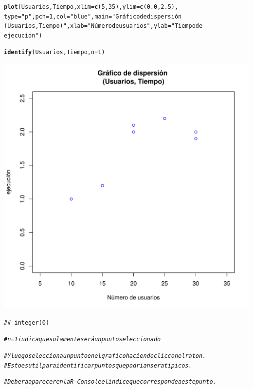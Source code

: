 \documentclass[12pt,letterpaper]{article}\usepackage[]{graphicx}\usepackage[]{color}
\makeatletter
\def\maxwidth{ %
  \ifdim\Gin@nat@width>\linewidth
    \linewidth
  \else
    \Gin@nat@width
  \fi
}
\newcommand{\hlnum}[1]{\textcolor[rgb]{0.686,0.059,0.569}{#1}}%
\newcommand{\hlstr}[1]{\textcolor[rgb]{0.192,0.494,0.8}{#1}}%
\newcommand{\hlcom}[1]{\textcolor[rgb]{0.678,0.584,0.686}{\textit{#1}}}%
\newcommand{\hlstd}[1]{\textcolor[rgb]{0.345,0.345,0.345}{#1}}%
\newcommand{\hlkwc}[1]{\textcolor[rgb]{0.333,0.667,0.333}{#1}}%
\newcommand{\hlkwd}[1]{\textcolor[rgb]{0.737,0.353,0.396}{\textbf{#1}}}%
\newenvironment{kframe}{%
 \def\at@end@of@kframe{}%
 \ifinner\ifhmode%
  \def\at@end@of@kframe{\end{minipage}}%
  \begin{minipage}{\columnwidth}%
 \fi\fi%
 \def\FrameCommand##1{\hskip\@totalleftmargin \hskip-\fboxsep
 \colorbox{shadecolor}{##1}\hskip-\fboxsep
     \hskip-\linewidth \hskip-\@totalleftmargin \hskip\columnwidth}%
 \MakeFramed {\advance\hsize-\width
   \@totalleftmargin\z@ \linewidth\hsize
   \@setminipage}}%
 {\par\unskip\endMakeFramed%
 \at@end@of@kframe}
\newenvironment{knitrout}{}{} %
\makeatother
\begin{document}
\begin{enumerate}
\begin{knitrout}
\begin{kframe}
\begin{alltt}
\hlkwd{plot}\hlstd{(Usuarios, Tiempo,} \hlkwc{xlim}\hlstd{=} \hlkwd{c}\hlstd{(}\hlnum{5}\hlstd{,} \hlnum{35}\hlstd{),} \hlkwc{ylim}\hlstd{=} \hlkwd{c}\hlstd{(}\hlnum{0.0}\hlstd{,} \hlnum{2.5}\hlstd{),}
\hlkwc{type} \hlstd{=} \hlstr{"p"}\hlstd{,} \hlkwc{pch}\hlstd{=}\hlnum{1}\hlstd{,} \hlkwc{col} \hlstd{=} \hlstr{"blue"}\hlstd{,} \hlkwc{main} \hlstd{=} \hlstr{"Gráfico de dispersión 
(Usuarios, Tiempo)"}\hlstd{,} \hlkwc{xlab}\hlstd{=}\hlstr{"Número de usuarios"}\hlstd{,} \hlkwc{ylab}\hlstd{=}\hlstr{"Tiempo de 
ejecución"}\hlstd{)}

\hlkwd{identify}\hlstd{(Usuarios, Tiempo,} \hlkwc{n}\hlstd{=}\hlnum{1}\hlstd{)}
\end{alltt}
\end{kframe}
\includegraphics[width=\maxwidth]{figure/unnamed-chunk-10-1} 
\begin{kframe}\begin{verbatim}
## integer(0)
\end{verbatim}
\begin{alltt}
\hlcom{# n=1 indicaque solamente será un punto seleccionado }

\hlcom{# Y luego selecciona un punto en el grafico haciendo clic con el raton.}
\hlcom{# Esto es util para identificar puntos que podrian ser atipicos.}

\hlcom{# Debera aparecer en la R-Console el indice que corresponde a este punto. }
\end{alltt}
\end{kframe}
\end{knitrout}


\end{enumerate}
\end{document}
